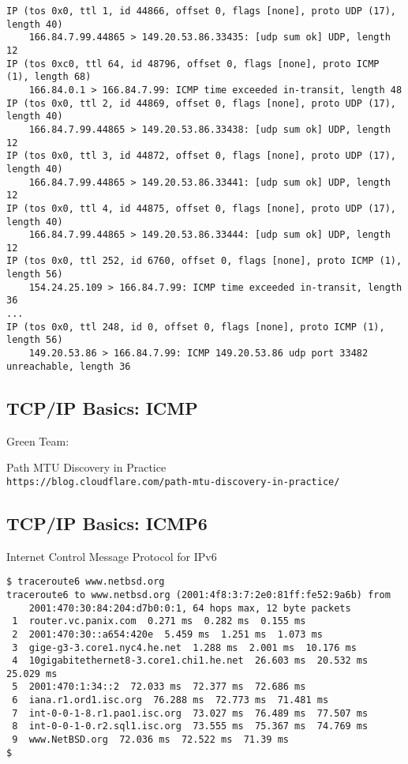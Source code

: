 \documentclass[xga]{xdvislides}
\begin{document}
\begin{verbatim}
IP (tos 0x0, ttl 1, id 44866, offset 0, flags [none], proto UDP (17), length 40)
    166.84.7.99.44865 > 149.20.53.86.33435: [udp sum ok] UDP, length 12
IP (tos 0xc0, ttl 64, id 48796, offset 0, flags [none], proto ICMP (1), length 68)
    166.84.0.1 > 166.84.7.99: ICMP time exceeded in-transit, length 48
IP (tos 0x0, ttl 2, id 44869, offset 0, flags [none], proto UDP (17), length 40)
    166.84.7.99.44865 > 149.20.53.86.33438: [udp sum ok] UDP, length 12
IP (tos 0x0, ttl 3, id 44872, offset 0, flags [none], proto UDP (17), length 40)
    166.84.7.99.44865 > 149.20.53.86.33441: [udp sum ok] UDP, length 12
IP (tos 0x0, ttl 4, id 44875, offset 0, flags [none], proto UDP (17), length 40)
    166.84.7.99.44865 > 149.20.53.86.33444: [udp sum ok] UDP, length 12
IP (tos 0x0, ttl 252, id 6760, offset 0, flags [none], proto ICMP (1), length 56)
    154.24.25.109 > 166.84.7.99: ICMP time exceeded in-transit, length 36
...
IP (tos 0x0, ttl 248, id 0, offset 0, flags [none], proto ICMP (1), length 56)
    149.20.53.86 > 166.84.7.99: ICMP 149.20.53.86 udp port 33482 unreachable, length 36
\end{verbatim}

\subsection{TCP/IP Basics: ICMP}
Green Team: \\
\vspace{.5in}

Path MTU Discovery in Practice \\
\verb+https://blog.cloudflare.com/path-mtu-discovery-in-practice/+

\subsection{TCP/IP Basics: ICMP6}
\begin{center}
Internet Control Message Protocol for IPv6
\end{center}
\vspace{.2in}

\begin{verbatim}
$ traceroute6 www.netbsd.org
traceroute6 to www.netbsd.org (2001:4f8:3:7:2e0:81ff:fe52:9a6b) from
    2001:470:30:84:204:d7b0:0:1, 64 hops max, 12 byte packets
 1  router.vc.panix.com  0.271 ms  0.282 ms  0.155 ms
 2  2001:470:30::a654:420e  5.459 ms  1.251 ms  1.073 ms
 3  gige-g3-3.core1.nyc4.he.net  1.288 ms  2.001 ms  10.176 ms
 4  10gigabitethernet8-3.core1.chi1.he.net  26.603 ms  20.532 ms  25.029 ms
 5  2001:470:1:34::2  72.033 ms  72.377 ms  72.686 ms
 6  iana.r1.ord1.isc.org  76.288 ms  72.773 ms  71.481 ms
 7  int-0-0-1-8.r1.pao1.isc.org  73.027 ms  76.489 ms  77.507 ms
 8  int-0-0-1-0.r2.sql1.isc.org  73.555 ms  75.367 ms  74.769 ms
 9  www.NetBSD.org  72.036 ms  72.522 ms  71.39 ms
$
\end{verbatim}
\end{document}
